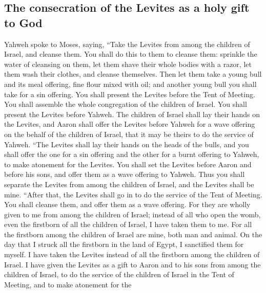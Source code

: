 \hypertarget{the-consecration-of-the-levites-as-a-holy-gift-to-god}{%
\subsection{The consecration of the Levites as a holy gift to
God}\label{the-consecration-of-the-levites-as-a-holy-gift-to-god}}

 Yahweh spoke to Moses, saying,  ``Take the
Levites from among the children of Israel, and cleanse them.
 You shall do this to them to cleanse them: sprinkle the
water of cleansing on them, let them shave their whole bodies with a
razor, let them wash their clothes, and cleanse themselves.
 Then let them take a young bull and its meal offering,
fine flour mixed with oil; and another young bull you shall take for a
sin offering.  You shall present the Levites before the
Tent of Meeting. You shall assemble the whole congregation of the
children of Israel.  You shall present the Levites before
Yahweh. The children of Israel shall lay their hands on the Levites,
 and Aaron shall offer the Levites before Yahweh for a
wave offering on the behalf of the children of Israel, that it may be
theirs to do the service of Yahweh.  ``The Levites shall
lay their hands on the heads of the bulls, and you shall offer the one
for a sin offering and the other for a burnt offering to Yahweh, to make
atonement for the Levites.  You shall set the Levites
before Aaron and before his sons, and offer them as a wave offering to
Yahweh.  Thus you shall separate the Levites from among
the children of Israel, and the Levites shall be mine. 
``After that, the Levites shall go in to do the service of the Tent of
Meeting. You shall cleanse them, and offer them as a wave offering.
 For they are wholly given to me from among the children
of Israel; instead of all who open the womb, even the firstborn of all
the children of Israel, I have taken them to me.  For all
the firstborn among the children of Israel are mine, both man and
animal. On the day that I struck all the firstborn in the land of Egypt,
I sanctified them for myself.  I have taken the Levites
instead of all the firstborn among the children of Israel.
 I have given the Levites as a gift to Aaron and to his
sons from among the children of Israel, to do the service of the
children of Israel in the Tent of Meeting, and to make atonement for the
